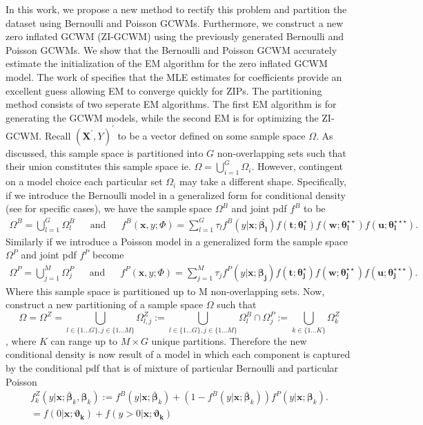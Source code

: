 \documentclass[11pt,letterpaper]{article}
\numberwithin{equation}{section}
\numberwithin{equation}{section}
\numberwithin{equation}{section}
\begin{document}
	In this work, we propose a new method to rectify this problem and partition the dataset using Bernoulli and Poisson GCWMs. Furthermore, we construct a new zero inflated GCWM (ZI-GCWM) using the previously generated Bernoulli and Poisson GCWMs. We show that the Bernoulli and Poisson GCWM accurately estimate the initialization of the EM algorithm for the zero inflated GCWM model. The work of \cite{Lambert} specifies that the MLE estimates for coefficients provide an excellent guess allowing EM to converge quickly for ZIPs. The partitioning method consists of two seperate EM algorithms. The first EM algorithm is for generating the GCWM models, while the second EM is for optimizing the ZI-GCWM. Recall $(\bm {X^{'}}, Y)^{'}$ to be a vector defined on some sample space $\Omega$. As discussed, this sample space is partitioned into $G$ non-overlapping sets such that their union constitutes this sample space ie. $ \Omega = \bigcup_{i=1}^G \Omega_i $.  However, contingent on a model choice each particular set $\Omega_i$ may take a different shape. 
	 Specifically, if we introduce the Bernoulli model in a generalized form for conditional density (see \cite{Ingrassia+Punzo+Vittadini+Minotti:2015} for specific cases), we have the sample space $\Omega^B$ and joint pdf $f^B$ to be \begin{align*} 
\Omega^B =  \bigcup_{l =1}^G \Omega_l^B & & \text{and} &  &
f^B(\bm x, y; \Phi)= \sum_{l=1}^{G} \tau_l f^B(y|\bm{x}; \bm{\bar{\beta_l}}) f(\bm{t};\bm{\theta_l^{\star}})f(\bm{w};\bm{\theta_l^{\star\star}})f(\bm{u};\bm{\theta_l^{\star\star\star}}). 
\end{align*} 
Similarly if we introduce a Poisson model in a generalized form the sample space $\Omega^P$ and joint pdf $f^P$ become
\begin{align*}
\Omega^P =  \bigcup_{j =1}^M \Omega_j^P & & \text{and} &  &
f^P(\bm x, y; \Phi)= \sum_{j=1}^{M} \tau_j f^P(y|\bm{x};\bm{\beta_{j}}) f(\bm{t};\bm{\theta_j^{\star}})f(\bm{w};\bm{\theta_j^{\star\star}})f(\bm{u};\bm{\theta_j^{\star\star\star}}).  
\end{align*}
Where this sample space is partitioned up to M non-overlapping sets. 
 Now, construct a new partitioning of a sample space $\Omega$ such that 
$$\Omega =  \Omega^Z = \bigcup_{l \in \{1 \ldots G \} , j \in \{1 \ldots M \}  } \Omega_{l,j}^Z := \bigcup_{l \in \{1 \ldots G \} , j \in \{1 \ldots M \}  }  \Omega_l^B \cap \Omega_j^P := \bigcup_{k \in \{1 \ldots K \}} \Omega_k^Z $$, where $K$ can range up to $M \times G$ unique partitions. Therefore the new conditional density  is now result of a model in which each component is captured by the conditional pdf that is of mixture of particular Bernoulli and particular Poisson
\begin{align} 
f^Z_{k}(y|\bm{x};  \bm{\bar{\beta}}_k,\bm{ \beta}_k) := f^B(y|\bm{x}; \bm{\bar{\beta}}_k) +(1-  f^B(y|\bm{x}; \bm{\bar{\beta}}_k) ) f^P(y|\bm{x};\bm{\beta}_k).
\label{initialziGCWM}\\ 
= f(0|\bm{x};\bm{\vartheta_{k} }) +  f(y > 0|\bm{x} ; \bm{\vartheta_{k}})
\label{ziGCWM} 
\end{align}
\end{document}

